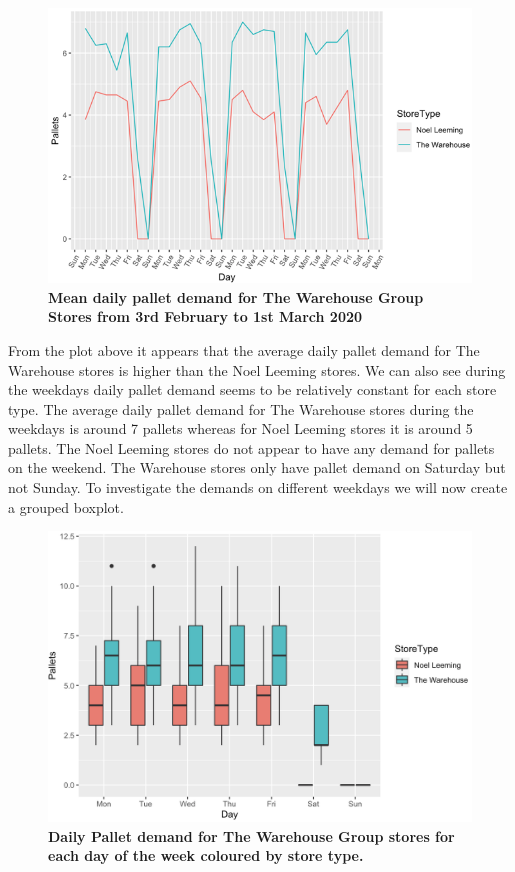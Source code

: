 \documentclass[11pt, a4paper]{article}   	%
\begin{document}
\begin{figure}[H]\centering
\includegraphics[scale=0.45]{D3}
\caption{\textbf{Mean daily pallet demand for The Warehouse Group Stores from 3rd February to 1st March 2020}}
\end{figure}

\noindent From the plot above it appears that the average daily pallet demand for The Warehouse stores is higher than the Noel Leeming stores. We can also see during the weekdays daily pallet demand seems to be relatively constant for each store type. The average daily pallet demand for The Warehouse stores during the weekdays is around 7 pallets whereas for Noel Leeming stores it is around 5 pallets. The Noel Leeming stores do not appear to have any demand for pallets on the weekend. The Warehouse stores only have pallet demand on Saturday but not Sunday. To investigate the demands on different weekdays we will now create a grouped boxplot.

\begin{figure}[H]\centering
\includegraphics[scale=0.45]{D4}
\caption{\textbf{Daily Pallet demand for The Warehouse Group stores for each day of the week coloured by store type.}}
\end{figure}
\end{document}
